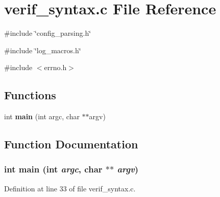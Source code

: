 \section{verif\_\-syntax.c File Reference}
\label{verif__syntax_8c}
{\ttfamily \#include \char`\"{}config\_\-parsing.h\char`\"{}}\par
{\ttfamily \#include \char`\"{}log\_\-macros.h\char`\"{}}\par
{\ttfamily \#include $<$errno.h$>$}\par
\subsection*{Functions}
\begin{DoxyCompactItemize}
\item 
int {\bf main} (int argc, char $\ast$$\ast$argv)
\end{DoxyCompactItemize}


\subsection{Function Documentation}
\subsubsection[{main}]{\setlength{\rightskip}{0pt plus 5cm}int main (int {\em argc}, \/  char $\ast$$\ast$ {\em argv})}\label{verif__syntax_8c_a3c04138a5bfe5d72780bb7e82a18e627}


Definition at line 33 of file verif\_\-syntax.c.